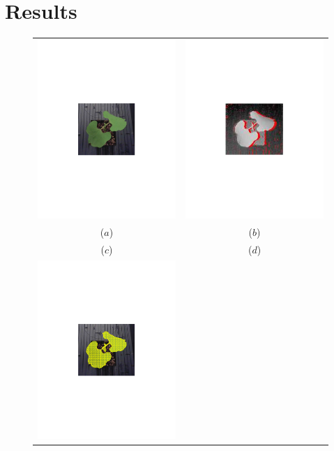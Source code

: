 \section{Results}
\label{sec:results}


\begin{figure}
\begin{center}
\begin{tabular}{cc}
\includegraphics[trim=190 280 190 290,clip,width=0.48\linewidth]{Figures/beanColor} &
\includegraphics[trim=190 280 190 290,clip,width=0.48\linewidth]{Figures/beanDepth} \\
($a$) & ($b$) \\
($c$) & ($d$) \\
\includegraphics[trim=190 280 190 290,clip,width=0.48\linewidth]{Figures/beanColorMesh} &

\end{tabular}
\end{center}
\end{figure}
